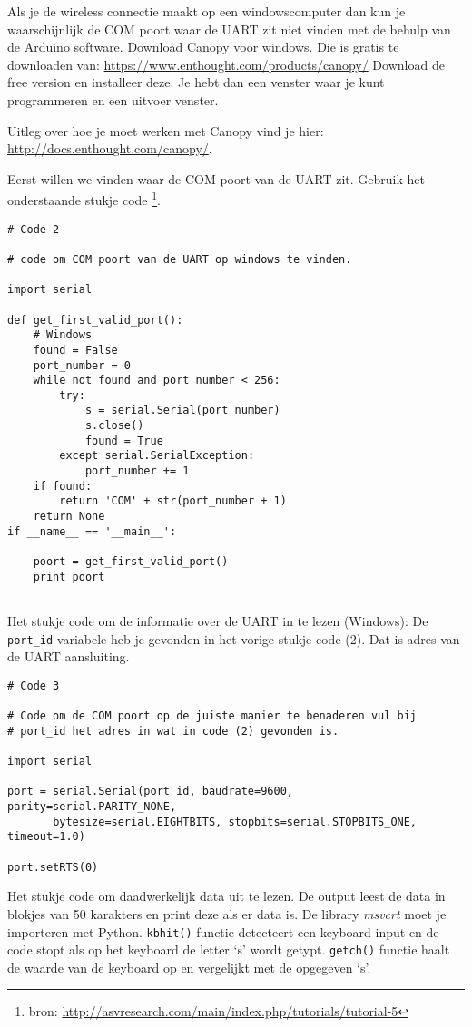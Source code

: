 Als je de wireless connectie maakt op een windowscomputer dan kun je 
waarschijnlijk de COM poort waar de UART zit niet vinden met de behulp van de 
Arduino software. Download Canopy voor windows.
Die is gratis te downloaden van: \url{https://www.enthought.com/products/canopy/}
Download de free version en installeer deze. Je hebt dan een venster waar je kunt
programmeren en een uitvoer venster.

Uitleg over hoe je moet werken met Canopy vind je hier:
\url{http://docs.enthought.com/canopy/}.

Eerst willen we vinden waar de COM poort van de UART zit. Gebruik het onderstaande 
stukje code \footnote{bron: \url{http://asvresearch.com/main/index.php/tutorials/tutorial-5}}.

\begin{verbatim}
# Code 2

# code om COM poort van de UART op windows te vinden.

import serial
 
def get_first_valid_port():
    # Windows
    found = False
    port_number = 0
    while not found and port_number < 256:
        try:
            s = serial.Serial(port_number)
            s.close()
            found = True
        except serial.SerialException:
            port_number += 1
    if found:
        return 'COM' + str(port_number + 1)
    return None
if __name__ == '__main__': 

    poort = get_first_valid_port()
    print poort
    
\end{verbatim}

Het stukje code om de informatie over de UART in te lezen (Windows):
De \verb|port_id| variabele heb je gevonden in het vorige stukje code (2).
Dat is adres van de UART aansluiting.

\begin{verbatim}
# Code 3

# Code om de COM poort op de juiste manier te benaderen vul bij 
# port_id het adres in wat in code (2) gevonden is.

import serial 

port = serial.Serial(port_id, baudrate=9600, parity=serial.PARITY_NONE, 
       bytesize=serial.EIGHTBITS, stopbits=serial.STOPBITS_ONE, timeout=1.0) 

port.setRTS(0)

\end{verbatim}


Het stukje code om daadwerkelijk data uit te lezen. De output leest de
data in blokjes van 50 karakters en print deze als er data is. De
library \emph{msvcrt} moet je importeren met Python. \verb|kbhit()|
functie detecteert een keyboard input en de code stopt als op het keyboard de
letter `s' wordt getypt. \verb|getch()| functie haalt de waarde van de keyboard 
 op en vergelijkt met de opgegeven `s'.

